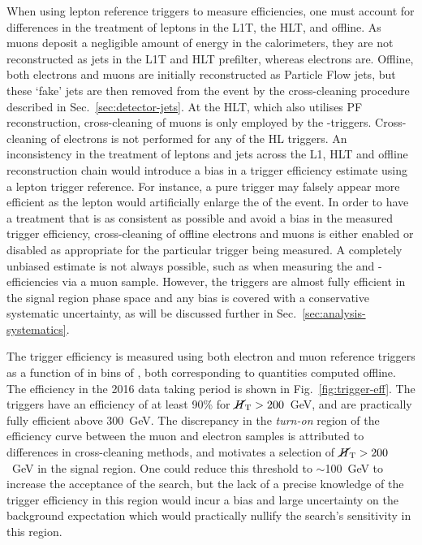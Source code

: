 When using lepton reference triggers to measure efficiencies, one must account 
for differences in the treatment of leptons in the L1T, the HLT, and offline. 
As muons deposit a negligible amount of energy in the calorimeters, they are 
not reconstructed as jets in the L1T and HLT prefilter, whereas electrons are. 
Offline, both electrons and muons are initially reconstructed as Particle Flow 
jets, but these `fake' jets are then removed from the event 
by the cross-cleaning procedure described in Sec.~\ref{sec:detector-jets}.
At the HLT, which also utilises PF reconstruction, 
cross-cleaning of muons is only employed by the \met-\mht triggers.
Cross-cleaning of electrons is not performed for any of the HL triggers.
An inconsistency in the treatment of leptons and jets across the L1, HLT and 
offline reconstruction chain would introduce a bias in a trigger efficiency 
estimate using a lepton trigger reference. For instance, a pure \scalht trigger 
may falsely appear more efficient as the lepton would artificially enlarge the 
\scalht of the event.
In order to have a treatment that is as consistent as possible and avoid a bias 
in the measured trigger efficiency, cross-cleaning of offline electrons and 
muons is either enabled or disabled as appropriate for the particular trigger 
being measured.
A completely unbiased estimate is not always possible, such as when measuring 
the \scalht and \scalht-\alphat efficiencies via a muon sample. However, the 
triggers are almost fully efficient in the signal region phase space and any 
bias is covered with a conservative systematic uncertainty, as will be 
discussed further in Sec.~\ref{sec:analysis-systematics}.

The trigger efficiency is measured using both electron and muon reference 
triggers as a function of \mht in bins of \scalht, 
both corresponding to quantities computed offline. The efficiency in the 2016 
data taking period is shown in Fig.~\ref{fig:trigger-eff}. The triggers have an 
efficiency of at least 90\% for $\mbox{$\cancel{H}_\text{T}$}>200$~GeV, and are practically fully 
efficient 
above 300~GeV. The discrepancy in the \textit{turn-on} region of the efficiency 
curve between the muon and electron samples is attributed to differences in 
cross-cleaning methods, and motivates a selection of $\mbox{$\cancel{H}_\text{T}$}>200$~GeV in the 
signal region. One could reduce this threshold to $\sim$100~GeV to increase the 
acceptance of the search, but the lack of a precise knowledge of the trigger 
efficiency in this region would incur a bias and large uncertainty on the 
background expectation which would practically nullify the search's sensitivity 
in this region.

